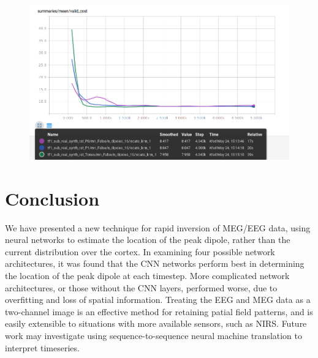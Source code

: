 \documentclass[journal,12pt,onecolumn,draftclsnofoot]{IEEEtran}
\begin{document}
\begin{figure}[h!]
\centering
\includegraphics[width=5in]{finalplots/train_synth_test_real_valid}
\caption{}
\label{fig:synthreal}
\end{figure}

\section{Conclusion}
We have presented a new technique for rapid inversion of MEG/EEG data, using neural networks to estimate the location of the peak dipole, rather than the current distribution over the cortex. In examining four possible network architectures, it was found that the CNN networks perform best in determining the location of the peak dipole at each timestep. More complicated network architectures, or those without the CNN layers, performed worse, due to overfitting and loss of spatial information. Treating the EEG and MEG data as a two-channel image is an effective method for retaining patial field patterns, and is easily extensible to situations with more available sensors, such as NIRS. Future work may investigate using sequence-to-sequence neural machine translation to interpret timeseries.

\iffalse%
\end{document}
